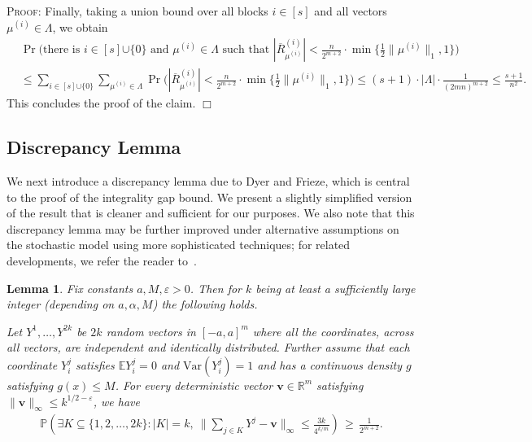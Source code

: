 \documentclass{article}
\newcommand{\e}{\varepsilon}
\newcommand{\red}[1]{{\color{red} #1}}
\newcommand{\E}{\mathbb{E}}
\newcommand{\R}{\mathbb{R}}
\renewcommand{\P}{\mathbb{P}}
\newcommand{\vv}[0]{\mathbf{v}}
\newcommand{\normm}[1]{\big\lVert#1\big\rVert}
\newtheorem{lem}[thm]{Lemma}
\newcommand{\nrc}{R}
\newenvironment{proof}[1][]
   {\textsc{Proof#1: }}
   {\hfill$\Box$\smallskip}
\begin{document}
\begin{proof}
Finally, taking a union bound over all blocks $i \in [s]$ and all vectors $\mu^{(i)} \in \Lambda$, we obtain 
%
\begin{align*}
    &\Pr\bigg(\textrm{there is $i \in [s] {\cup \{0\}} $ and $\mu^{(i)} \in \Lambda$ such that $|\overline{\nrc}^{(i)}_{\mu^{(i)}}| < \frac{n}{2^{m+{2}}} \cdot \min\bigg\{ \frac{1}{{2}} \normm{\mu^{(i)}}_1, 1\bigg\}$}  \bigg) \\
    &\le     \sum_{i \in [s] {\cup \{0\}}} \sum_{\mu^{(i)} \in \Lambda} \Pr\bigg(|\overline{\nrc}^{(i)}_{\mu^{(i)}}| < \frac{n}{2^{m+{2}}} \cdot \min\bigg\{ \frac{1}{{2}} \normm{\mu^{(i)}}_1, 1\bigg\} \bigg)  \le ({s+1}) \cdot |\Lambda| \cdot \frac{1}{(2mn)^{m+{2}}} \le \frac{s+1}{n^2}.
\end{align*}
This concludes the proof of the claim. 
\end{proof}



\subsection{Discrepancy Lemma} \label{sec:prelim}


We next introduce a discrepancy lemma due to Dyer and Frieze, which is central
to the proof of the integrality gap bound. We present a slightly
simplified version of the result that is cleaner and sufficient for our
purposes.
We also note that this discrepancy lemma may be further improved under
alternative assumptions on the stochastic model using more sophisticated
techniques; for related developments, we refer the reader
to~\cite{borst2023integrality,borst2023integrality_discrepancy}.
\begin{lem}
    \cite{dyer1989probabilistic}
    \label{lem_discrepancy}
    Fix constants $a, M, \e > 0$. Then for $k$ being at least a sufficiently large integer (depending on $a, \alpha, M$) the following holds.
    
Let $Y^1, \ldots, Y^{2k}$ be $2k$ random vectors in $[-a,a]^m$ where all the coordinates, across all vectors, are independent and identically distributed. Further assume that each coordinate $Y^j_i$ satisfies $\E Y^j_i = 0$ and $\mathrm{Var}(Y^j_i) = 1$ and has a continuous density $g$ satisfying $g(x) \leq M$. For every deterministic vector $\vv \in \R^m$ satisfying $\|\vv\|_{\infty} \le k^{1/2 - \e}$, we have 
%
\begin{align*}
\P\left( \exists K \subseteq \{1, 2, \ldots, 2k\} : |K| = k,\ \bigg\|\sum_{j \in K} Y^j - \vv\bigg\|_{\infty} \le \frac{3k}{4^{k/m}} \right) 
\,\geq\, \frac{1}{2^{m+2}}.
\end{align*}
\end{lem}
\end{document}
